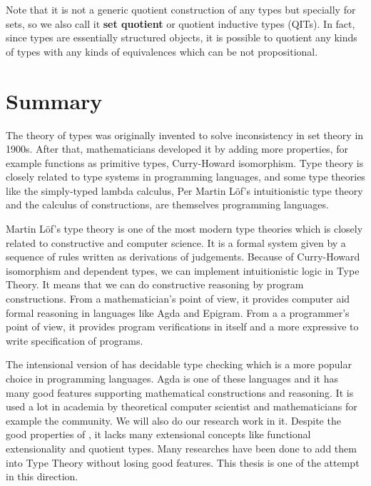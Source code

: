 Note that it is not a generic quotient construction of any types but specially for sets, so
we also call it \textbf{set quotient} or quotient inductive types (QITs). In fact, since types are essentially structured objects, it is possible to quotient any kinds of types with any kinds of equivalences which can be not propositional.
 

\section{Summary}


The theory of types was originally invented to solve inconsistency in set theory in 1900s. After that, mathematicians developed it by adding more properties, for example functions as primitive types, Curry-Howard isomorphism. Type theory is closely related to type systems in programming languages, and some type theories like the simply-typed lambda calculus, Per Martin L\"{o}f's intuitionistic type theory and the calculus of constructions, are themselves programming languages. 

Martin L\"{o}f's type theory is one of the most modern type theories which is closely related to constructive \maths and computer science. It is a formal system given by a sequence of rules written as derivations of judgements. Because of Curry-Howard isomorphism and dependent types, we can implement intuitionistic logic in Type Theory. It means that we can do constructive reasoning by program constructions. From a mathematician's point of view, it provides computer aid formal reasoning in languages like Agda and Epigram. From a a programmer's point of view, it provides program verifications in itself and a more expressive to write specification of programs.

The intensional version of \mltt has decidable type checking which is a more popular choice in programming languages. Agda is one of these languages and it has many good features supporting mathematical constructions and reasoning. It is used a lot in academia by theoretical computer scientist and mathematicians for example the \hott community. We will also do our research work in it.
Despite the good properties of \itt, it lacks many extensional concepts like functional extensionality and quotient types. Many researches have been done to add them into Type Theory without losing good features. This thesis is one of the attempt in this direction.




